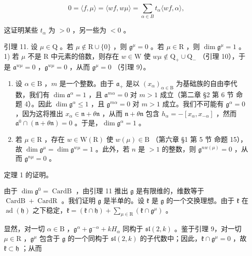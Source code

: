 \[
0 = \langle f, \mu \rangle = \langle w f, w \mu \rangle = \sum_ {\alpha \in B} t _ {\alpha} \langle w f, \alpha \rangle ,
\]

这证明某些 \(t_{\alpha}\) 为 \(> 0\) ，另一些为 \(< 0\) 。

引理 11. 设 \(\mu \in \mathrm{Q}\) 。若 \(\mu \notin \mathrm{R} \cup \{0\}\) ，则 \(\mathfrak{g}^{\mu} = 0\) 。若 \(\mu \in \mathrm{R}\) ，则 \(\dim \mathfrak{g}^{\mu} = 1\) 。 1) 若 \(\mu\) 不是 \(\mathrm{R}\) 中元素的倍数，则存在 \(w \in \mathrm{W}\) 使 \(w\mu \notin \mathrm{Q}_{+} \cup \mathrm{Q}_{-}\) （引理 10），于是 \(\mathfrak{a}^{w\mu} = 0\) ，\(\mathfrak{g}^{w\mu} = 0\) ，从而 \(\mathfrak{g}^{\mu} = 0\) （引理 9）。

\begin{enumerate}
\def\labelenumi{\arabic{enumi})}
\setcounter{enumi}{1}
\item
  设 \(\alpha \in \mathrm{B}\) ，\(m\) 是一个整数。由于 \(\mathfrak{a}_{+}\) 是以 \((x_{\alpha})_{\alpha \in \mathrm{B}}\) 为基础族的自由李代数，我们有 \(\dim \mathfrak{a}^{\alpha} = 1\) ，且 \(\mathfrak{a}^{m\alpha} = 0\) 对 \(m > 1\) 成立（第二章 §2 第 6 节 命题 4）。因此 \(\dim \mathfrak{g}^{\alpha} \leq 1\) ，且 \(\mathfrak{g}^{m\alpha} = 0\) 对 \(m > 1\) 成立。我们不可能有 \(\mathfrak{g}^{\alpha} = 0\) ，因为这将推出 \(x_{\alpha} \in \mathfrak{n} + \theta \mathfrak{n}\) ，从而 \(\mathfrak{n} + \theta \mathfrak{n}\) 包含 \(h_{\alpha} = -[x_{\alpha}, x_{-\alpha}]\) ，然而 \(\mathfrak{a}^0 \cap (\mathfrak{n} + \theta \mathfrak{n}) = 0\) 。于是，\(\dim \mathfrak{g}^{\alpha} = 1\) 。
\item
  若 \(\mu \in \mathrm{R}\) ，存在 \(w \in \mathrm{W}(\mathrm{R})\) 使 \(w(\mu) \in \mathrm{B}\) （第六章 §1 第 5 节 命题 15），故 \(\dim \mathfrak{g}^{\mu} = \dim \mathfrak{g}^{w\mu} = 1\) 。此外，若 \(n\) 是 \(>1\) 的整数，则 \(\mathfrak{g}^{nw(\mu)} = 0\) ，从而 \(\mathfrak{g}^{n\mu} = 0\) 。
\end{enumerate}

定理 1 的证明。

由于 \(\dim \mathfrak{g}^0 = \operatorname{CardB}\) ，由引理 11 推出 \(\mathfrak{g}\) 是有限维的，维数等于 \(\operatorname{CardB} + \operatorname{CardR}\) 。我们证明 \(\mathfrak{g}\) 是半单的。设 \(\mathfrak{k}\) 是 \(\mathfrak{g}\) 的一个交换理想。由于 \(\mathfrak{k}\) 在 \(\operatorname{ad}(\mathfrak{h})\) 之下稳定，\(\mathfrak{k} = (\mathfrak{k} \cap \mathfrak{h}) + \sum_{\mu \in \mathrm{R}} (\mathfrak{k} \cap \mathfrak{g}^\mu)\) 。

显然，对一切 \(\alpha \in \mathrm{B}\) ，\(\mathfrak{g}^{\alpha} + \mathfrak{g}^{-\alpha} + kH_{\alpha}\) 同构于 \(\mathfrak{sl}(2,k)\) 。鉴于引理 9，对一切 \(\mu \in \mathrm{R}\) ，\(\mathfrak{g}^{\mu}\) 包含于 \(\mathfrak{g}\) 的一个同构于 \(\mathfrak{sl}(2,k)\) 的子代数中；因此，\(\mathfrak{k} \cap \mathfrak{g}^{\mu} = 0\) ，故 \(\mathfrak{k} \subset \mathfrak{h}\) ；从而

